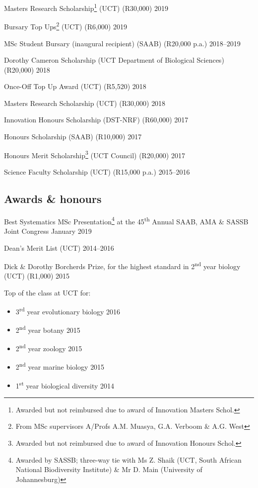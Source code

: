 \documentclass[10pt]{article}
\begin{document}
Masters Research Scholarship\footnote{Awarded but not reimbursed due to award 
of Innovation Masters Schol.} (UCT) (R30,000)               \hfill {\small 2019}

Bursary Top Ups\footnote{From MSc supervisors A/Profs A.M. Muasya, G.A. Verboom 
\& A.G. West} (UCT) (R6,000)                                \hfill {\small 2019}

MSc Student Bursary (inaugural recipient) (SAAB) (R20,000 p.a.)
                                                      \hfill {\small 2018--2019}

Dorothy Cameron Scholarship (UCT Department of Biological Sciences) (R20,000)
                                                            \hfill {\small 2018}

Once-Off Top Up Award (UCT) (R5,520)                        \hfill {\small 2018}

Masters Research Scholarship (UCT) (R30,000)                \hfill {\small 2018}

Innovation Honours Scholarship (DST-NRF) (R60,000)          \hfill {\small 2017}

Honours Scholarship (SAAB) (R10,000)                        \hfill {\small 2017}

Honours Merit Scholarship\footnote{Awarded but not reimbursed due to award of 
Innovation Honours Schol.} (UCT Council) (R20,000)          \hfill {\small 2017}

Science Faculty Scholarship (UCT) (R15,000 p.a.)      \hfill {\small 2015--2016}

\subsection*{Awards \& honours}

Best Systematics MSc Presentation\footnote{Awarded by SASSB; three-way tie with 
Ms Z. Shaik (UCT, South African National Biodiversity Institute) \& Mr D. Main
(University of Johannesburg)} at the 45\textsuperscript{th} Annual SAAB, AMA \&
SASSB Joint Congress                                \hfill {\small January 2019}

Dean's Merit List (UCT)                               \hfill {\small 2014--2016}

Dick \& Dorothy Borcherds Prize, for the highest standard in 
2\textsuperscript{nd} year biology (UCT) (R1,000)           \hfill {\small 2015}

Top of the class at UCT for:

\begin{itemize}[noitemsep, nolistsep]
  \item 3\textsuperscript{rd} year evolutionary biology     \hfill {\small 2016}
  \item 2\textsuperscript{nd} year botany                   \hfill {\small 2015}
  \item 2\textsuperscript{nd} year zoology                  \hfill {\small 2015}
  \item 2\textsuperscript{nd} year marine biology           \hfill {\small 2015}
  \item 1\textsuperscript{st} year biological diversity     \hfill {\small 2014}
\end{itemize}
\end{document}
